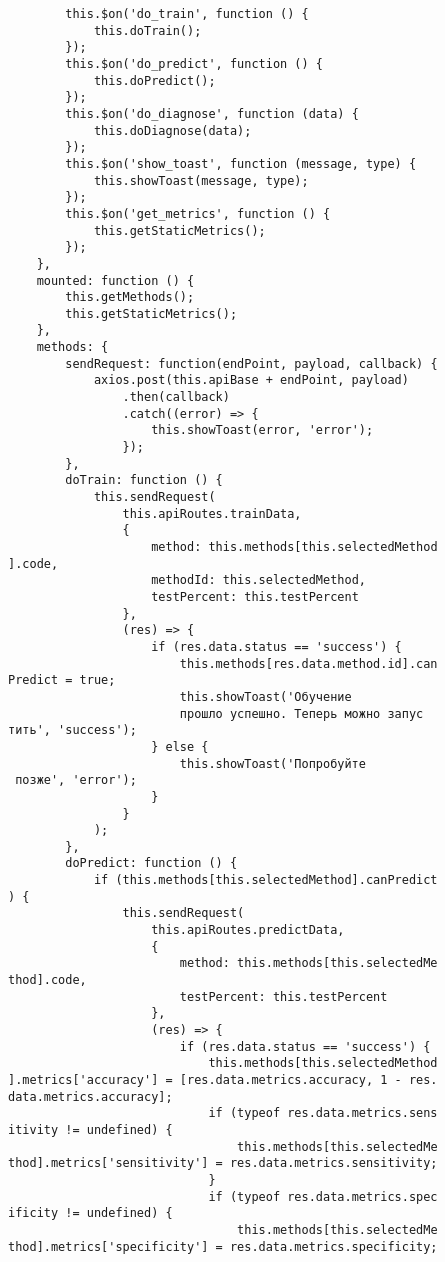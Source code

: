 \begin{verbatim}
        this.$on('do_train', function () {
            this.doTrain();
        });
        this.$on('do_predict', function () {
            this.doPredict();
        });
        this.$on('do_diagnose', function (data) {
            this.doDiagnose(data);
        });
        this.$on('show_toast', function (message, type) {
            this.showToast(message, type);
        });
        this.$on('get_metrics', function () {
            this.getStaticMetrics();
        });
    },
    mounted: function () {
        this.getMethods();
        this.getStaticMetrics();
    },
    methods: {
        sendRequest: function(endPoint, payload, callback) {
            axios.post(this.apiBase + endPoint, payload)
                .then(callback)
                .catch((error) => {
                    this.showToast(error, 'error');
                });
        },
        doTrain: function () {
            this.sendRequest(
                this.apiRoutes.trainData,
                {
                    method: this.methods[this.selectedMethod
].code,
                    methodId: this.selectedMethod,
                    testPercent: this.testPercent
                },
                (res) => {
                    if (res.data.status == 'success') {
                        this.methods[res.data.method.id].can
Predict = true;
                        this.showToast('Обучение 
                        прошло успешно. Теперь можно запус
тить', 'success');
                    } else {
                        this.showToast('Попробуйте
 позже', 'error');
                    }
                }
            );
        },
        doPredict: function () {
            if (this.methods[this.selectedMethod].canPredict
) {
                this.sendRequest(
                    this.apiRoutes.predictData,
                    {
                        method: this.methods[this.selectedMe
thod].code,
                        testPercent: this.testPercent
                    },
                    (res) => {
                        if (res.data.status == 'success') {
                            this.methods[this.selectedMethod
].metrics['accuracy'] = [res.data.metrics.accuracy, 1 - res.
data.metrics.accuracy];
                            if (typeof res.data.metrics.sens
itivity != undefined) {
                                this.methods[this.selectedMe
thod].metrics['sensitivity'] = res.data.metrics.sensitivity;
                            }
                            if (typeof res.data.metrics.spec
ificity != undefined) {
                                this.methods[this.selectedMe
thod].metrics['specificity'] = res.data.metrics.specificity;

\end{verbatim}
